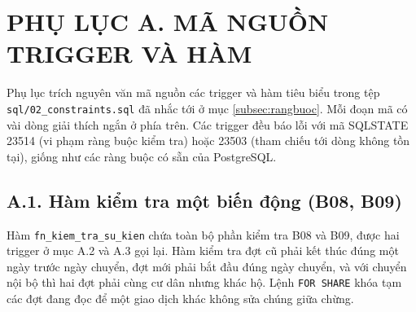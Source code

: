 \section*{PHỤ LỤC A. MÃ NGUỒN TRIGGER VÀ HÀM}
\label{sec:phuluc}

Phụ lục trích nguyên văn mã nguồn các trigger và hàm tiêu biểu trong tệp \texttt{sql/02\_constraints.sql} đã nhắc tới ở mục \ref{subsec:rangbuoc}. Mỗi đoạn mã có vài dòng giải thích ngắn ở phía trên. Các trigger đều báo lỗi với mã SQLSTATE 23514 (vi phạm ràng buộc kiểm tra) hoặc 23503 (tham chiếu tới dòng không tồn tại), giống như các ràng buộc có sẵn của PostgreSQL.

\subsection*{A.1. Hàm kiểm tra một biến động (B08, B09)}

Hàm \texttt{fn\_kiem\_tra\_su\_kien} chứa toàn bộ phần kiểm tra B08 và B09, được hai trigger ở mục A.2 và A.3 gọi lại. Hàm kiểm tra đợt cũ phải kết thúc đúng một ngày trước ngày chuyển, đợt mới phải bắt đầu đúng ngày chuyển, và với chuyển nội bộ thì hai đợt phải cùng cư dân nhưng khác hộ. Lệnh \texttt{FOR SHARE} khóa tạm các đợt đang đọc để một giao dịch khác không sửa chúng giữa chừng.


